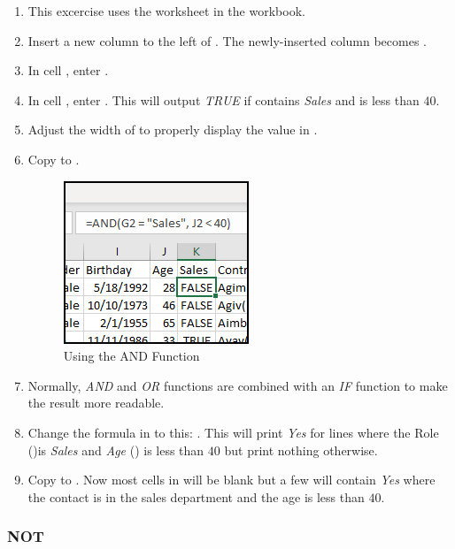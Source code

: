 \begin{enumerate}
	\item This excercise uses the  worksheet in the  workbook.
	\item Insert a new column to the left of . The newly-inserted column becomes .
	\item In cell , enter .
	\item In cell , enter . This will output \textit{TRUE} if  contains \textit{Sales} and  is less than $ 40 $. 
	\item Adjust the width of  to properly display the value in .
	\item Copy  to .
	
	\begin{figure}[H]
		\centering
		\includegraphics[width=\maxwidth{.75\linewidth}]{gfx/ch09_fig47}
		\caption{Using the AND Function}
		\label{09:fig47}
	\end{figure}

	\item Normally, \textit{AND} and \textit{OR} functions are combined with an \textit{IF} function to make the result more readable.
	\item Change the formula in  to this: . This will print \textit{Yes} for lines where the Role ()is \textit{Sales} and \textit{Age} () is less than $ 40 $ but print nothing otherwise. 
	\item Copy  to . Now most cells in  will be blank but a few will contain \textit{Yes} where the contact is in the sales department and the age is less than $ 40 $.
\end{enumerate}

\subsubsection{NOT}

